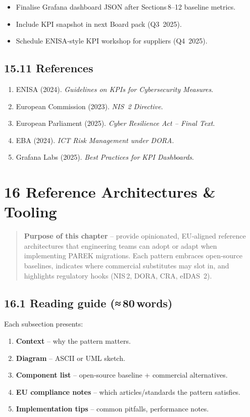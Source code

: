 \documentclass[
  english,
]{article}
\providecommand{\tightlist}{%
  \setlength{\itemsep}{0pt}\setlength{\parskip}{0pt}}
\begin{document}
\begin{itemize}
\tightlist
\item
  Finalise Grafana dashboard JSON after Sections\,8--12 baseline
  metrics.
\item
  Include KPI snapshot in next Board pack (Q3~2025).
\item
  Schedule ENISA‑style KPI workshop for suppliers (Q4~2025).
\end{itemize}

\subsection{15.11 References}\label{references-6}

\begin{enumerate}
\def\labelenumi{\arabic{enumi}.}
\tightlist
\item
  ENISA (2024). \emph{Guidelines on KPIs for Cybersecurity Measures}.
\item
  European Commission (2023). \emph{NIS~2 Directive}.
\item
  European Parliament (2025). \emph{Cyber Resilience Act -- Final Text}.
\item
  EBA (2024). \emph{ICT Risk Management under DORA}.
\item
  Grafana Labs (2025). \emph{Best Practices for KPI Dashboards}.
\end{enumerate}

\section{16 Reference Architectures \&
Tooling}\label{reference-architectures-tooling}

\begin{quote}
\textbf{Purpose of this chapter} -- provide opinionated, EU‑aligned
reference architectures that engineering teams can adopt or adapt when
implementing PAREK migrations. Each pattern embraces open‑source
baselines, indicates where commercial substitutes may slot in, and
highlights regulatory hooks (NIS\,2, DORA, CRA, eIDAS~2).
\end{quote}

\subsection{16.1 Reading guide
(≈\,80\,words)}\label{reading-guide-80-words}

Each subsection presents:

\begin{enumerate}
\def\labelenumi{\arabic{enumi}.}
\tightlist
\item
  \textbf{Context} -- why the pattern matters.
\item
  \textbf{Diagram} -- ASCII or UML sketch.
\item
  \textbf{Component list} -- open‑source baseline + commercial
  alternatives.
\item
  \textbf{EU compliance notes} -- which articles/standards the pattern
  satisfies.
\item
  \textbf{Implementation tips} -- common pitfalls, performance notes.
\end{enumerate}
\end{document}
